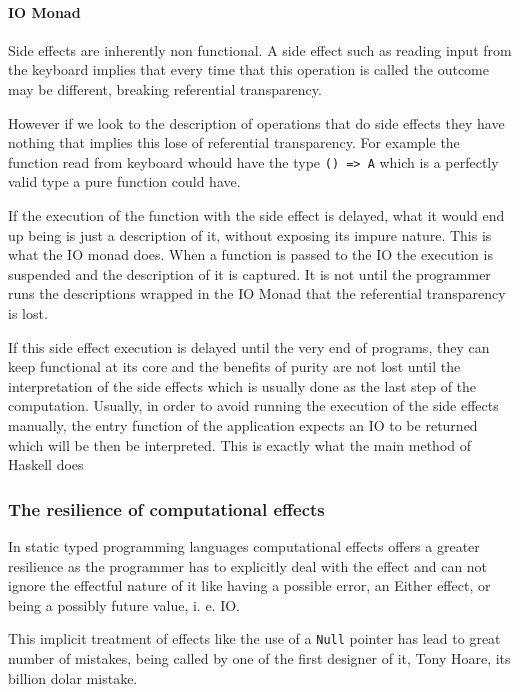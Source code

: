\documentclass[../main.tex]{subfiles}
\begin{document}


\paragraph{IO Monad}
Side effects are inherently non functional. A side effect such as reading input
from the keyboard implies that every time that this operation is called the
outcome may be different, breaking referential transparency.

However if we look to the description of operations that do side effects they
have nothing that implies this lose of referential transparency. For example
the function read from keyboard whould have the type \texttt{() => A} which is a
perfectly valid type a pure function could have.

If the execution of the function with the side effect is delayed, what it
would end up being is just a description of it, without exposing its impure
nature. This is what the IO monad does. When a function is passed to the IO
the execution is suspended and the description of it is captured. It is not
until the programmer runs the descriptions wrapped in the IO Monad that the
referential transparency is lost.

If this side effect execution is delayed until the very end of programs, they
can keep functional at its core and the benefits of purity are not lost until
the interpretation of the side effects which is usually done as the last step of
the computation. Usually, in order to avoid running the execution of the side
effects manually, the entry function of the application expects an IO to be
returned which will be then be interpreted. This is exactly what the main method
of Haskell does \autocite{AIO}

\subsubsection{The resilience of computational effects}
In static typed programming languages computational effects offers a greater resilience as the
programmer has to explicitly deal with the effect and can not ignore the
effectful nature of it like having a possible error, an Either effect, or being a possibly
future value, i. e. IO.

This implicit treatment of effects like the use of a \texttt{Null} pointer has
lead to great number of mistakes, being called by one of the first designer of
it, Tony Hoare, its billion dolar mistake.
\end{document}
